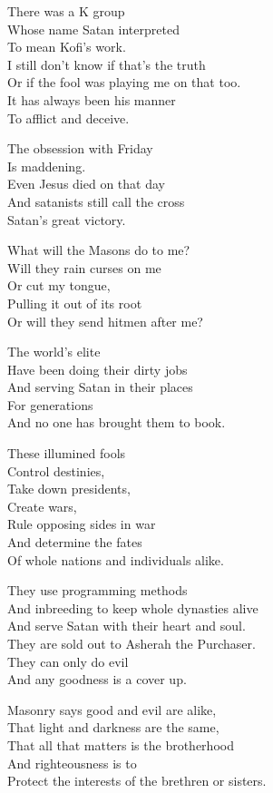\documentclass[
]{book}
\begin{document}
There was a K group\\
Whose name Satan interpreted\\
To mean Kofi's work.\\
I still don't know if that's the truth\\
Or if the fool was playing me on that too.\\
It has always been his manner\\
To afflict and deceive.

The obsession with Friday\\
Is maddening.\\
Even Jesus died on that day\\
And satanists still call the cross\\
Satan's great victory.

What will the Masons do to me?\\
Will they rain curses on me\\
Or cut my tongue,\\
Pulling it out of its root\\
Or will they send hitmen after me?

The world's elite\\
Have been doing their dirty jobs\\
And serving Satan in their places\\
For generations\\
And no one has brought them to book.

These illumined fools\\
Control destinies,\\
Take down presidents,\\
Create wars,\\
Rule opposing sides in war\\
And determine the fates\\
Of whole nations and individuals alike.

They use programming methods\\
And inbreeding to keep whole dynasties alive\\
And serve Satan with their heart and soul.\\
They are sold out to Asherah the Purchaser.\\
They can only do evil\\
And any goodness is a cover up.

Masonry says good and evil are alike,\\
That light and darkness are the same,\\
That all that matters is the brotherhood\\
And righteousness is to\\
Protect the interests of the brethren or sisters.
\end{document}
